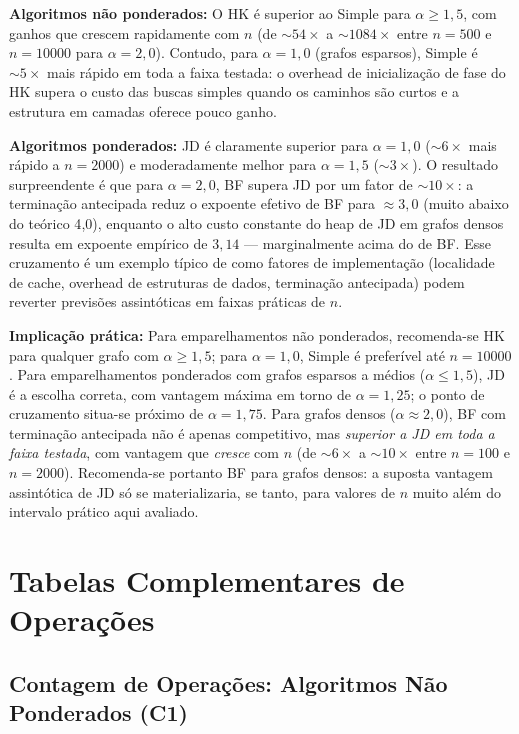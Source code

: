 \documentclass{infufrgs}
\begin{document}
\textbf{Algoritmos não ponderados:} O HK é superior ao Simple para $\alpha \ge 1{,}5$, com ganhos que crescem rapidamente com $n$ (de $\sim 54\times$ a $\sim 1084\times$ entre $n=500$ e $n=10000$ para $\alpha = 2{,}0$). Contudo, para $\alpha = 1{,}0$ (grafos esparsos), Simple é $\sim 5\times$ mais rápido em toda a faixa testada: o overhead de inicialização de fase do HK supera o custo das buscas simples quando os caminhos são curtos e a estrutura em camadas oferece pouco ganho.

\textbf{Algoritmos ponderados:} JD é claramente superior para $\alpha = 1{,}0$ ($\sim 6\times$ mais rápido a $n = 2000$) e moderadamente melhor para $\alpha = 1{,}5$ ($\sim 3\times$). O resultado surpreendente é que para $\alpha = 2{,}0$, BF supera JD por um fator de $\sim 10\times$: a terminação antecipada reduz o expoente efetivo de BF para $\approx 3{,}0$ (muito abaixo do teórico 4{,}0), enquanto o alto custo constante do heap de JD em grafos densos resulta em expoente empírico de $3{,}14$ --- marginalmente acima do de BF. Esse cruzamento é um exemplo típico de como fatores de implementação (localidade de cache, overhead de estruturas de dados, terminação antecipada) podem reverter previsões assintóticas em faixas práticas de $n$.

\textbf{Implicação prática:} Para emparelhamentos não ponderados, recomenda-se HK para qualquer grafo com $\alpha \ge 1{,}5$; para $\alpha = 1{,}0$, Simple é preferível até $n = 10000$. Para emparelhamentos ponderados com grafos esparsos a médios ($\alpha \le 1{,}5$), JD é a escolha correta, com vantagem máxima em torno de $\alpha = 1{,}25$; o ponto de cruzamento situa-se próximo de $\alpha = 1{,}75$. Para grafos densos ($\alpha \approx 2{,}0$), BF com terminação antecipada não é apenas competitivo, mas \emph{superior a JD em toda a faixa testada}, com vantagem que \emph{cresce} com $n$ (de $\sim 6\times$ a $\sim 10\times$ entre $n=100$ e $n=2000$). Recomenda-se portanto BF para grafos densos: a suposta vantagem assintótica de JD só se materializaria, se tanto, para valores de $n$ muito além do intervalo prático aqui avaliado.

\appendix
\chapter{Tabelas Complementares de Operações}

\section{Contagem de Operações: Algoritmos Não Ponderados (C1)}
\end{document}
